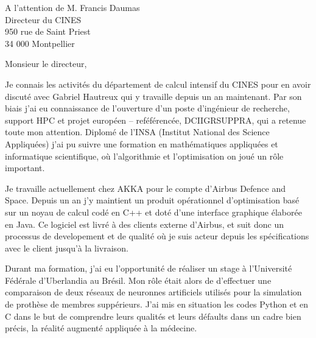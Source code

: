 \documentclass[10pt,a4paper]{lettre}
\begin{document}
\begin{letter}{A l'attention de M. Francis Daumas\\Directeur du CINES\\950 rue de Saint Priest\\34 000 Montpellier}
\address{Victor Cameo Ponz\\16 rue Peyras\\31000 Toulouse}
\nofax

\opening{Monsieur le directeur,}

{
Je connais les activités du département de calcul intensif du CINES pour en
avoir discuté avec Gabriel Hautreux qui y travaille depuis un an
maintenant.
Par son biais j'ai eu connaissance de l'ouverture d'un poste d'ingénieur de recherche,
support HPC et projet européen -- reféférencée, DCIIGRSUPPRA,
qui a retenue toute mon attention.
Diplomé de l'INSA (Institut National des Science Appliquées) j'ai pu suivre
une formation en mathématiques appliquées et informatique scientifique, où
l'algorithmie et l'optimisation on joué un rôle important. %
}

{
Je travaille
actuellement chez AKKA pour le compte d'Airbus Defence and Space.
Depuis un an j'y maintient un produit opérationnel d'optimisation
basé sur un noyau de calcul codé en C++ et doté d'une interface graphique élaborée en Java.
Ce logiciel est livré à des clients externe d'Airbus, et suit donc un
processus de developement et de qualité où
je suis acteur depuis les spécifications avec le client jusqu'à la livraison.


Durant ma formation, j'ai eu l'opportunité de réaliser un stage à
l'Université Fédérale d'Uberlandia au Brésil.
Mon rôle était alors de d'effectuer une comparaison de deux réseaux de neuronnes artificiels utilisés pour la simulation de prothèse de membres suppérieurs.
J'ai mis en situation les codes Python et en C dans le but de comprendre leurs
qualités et leurs défaults dans un cadre bien précis, la réalité augmenté
appliquée à la médecine. %

}
\end{letter}
\end{document}
